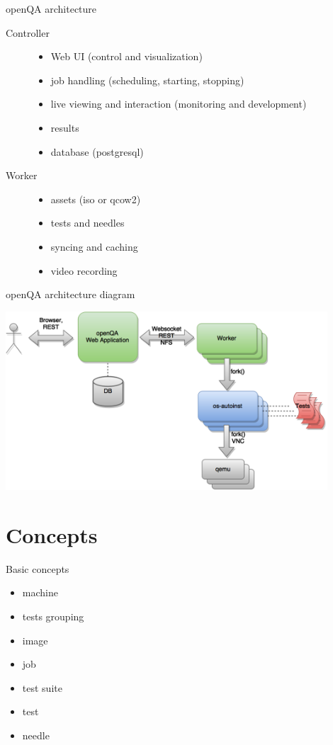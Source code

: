 \documentclass[12pt,aspectratio=169]{beamer}
\begin{document}
\begin{frame}{openQA architecture}
	\begin{description}
		\item[Controller]
			\begin{itemize}
				\item Web UI (control and visualization)
				\item job handling (scheduling, starting, stopping)
				\item live viewing and interaction (monitoring and development)
				\item results
				\item database (postgresql)
			\end{itemize}
		\item[Worker]
			\begin{itemize}
				\item assets (iso or qcow2)
				\item tests and needles 
				\item syncing and caching 
				\item video recording
			\end{itemize}
	\end{description}
\end{frame}

\begin{frame}{openQA architecture diagram}
	\begin{center}
		\includegraphics[width=12cm]{architecture}
	\end{center}
\end{frame}

\section{Concepts}

\begin{frame}{Basic concepts}
	\begin{itemize}
		\item machine
		\item tests grouping
		\item image
		\item job
		\item test suite
		\item test
		\item needle
	\end{itemize}
\end{frame}
\end{document}
